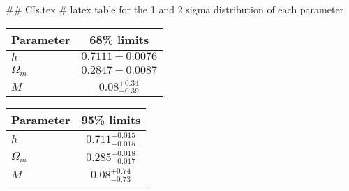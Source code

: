 ## CIs.tex
# latex table for the 1 and 2 sigma distribution of each parameter

\begin{tabular} { l  c}
 Parameter &  68\% limits\\
\hline
{\boldmath$h              $} & $0.7111\pm 0.0076          $\\
{\boldmath$\Omega_m       $} & $0.2847\pm 0.0087          $\\
{\boldmath$M              $} & $0.08^{+0.34}_{-0.39}      $\\
\hline
\end{tabular}

\begin{tabular} { l  c}
 Parameter &  95\% limits\\
\hline
{\boldmath$h              $} & $0.711^{+0.015}_{-0.015}   $\\
{\boldmath$\Omega_m       $} & $0.285^{+0.018}_{-0.017}   $\\
{\boldmath$M              $} & $0.08^{+0.74}_{-0.73}      $\\
\hline
\end{tabular}
